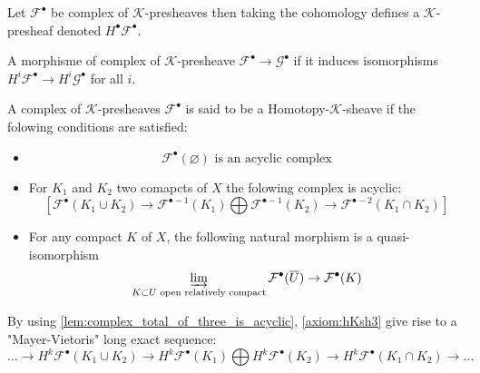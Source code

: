 \begin{definition}\label{def:cohomology_of_k-prsh}
    Let $\mathcal{F}^{\bullet}$ be complex of $\mathcal{K}$-presheaves then taking the cohomology defines a $\mathcal{K}$-presheaf denoted $H^{\bullet}\mathcal{F}^{\bullet}$.
\end{definition}

\begin{definition}\label{def:quasi_iso_of_complex_of_k-prsh}
    A morphisme of complex of $\mathcal{K}$-presheave $\mathcal{F}^{\bullet}\to\mathcal{G}^{\bullet}$ if it induces isomorphisms $H^i\mathcal{F}^{\bullet}\to H^i\mathcal{G}^{\bullet}$ for all $i$.
\end{definition}

\begin{definition}\label{def:homotopy_k_sheaf}
    A complex of $\mathcal{K}$-presheaves $\mathcal{F}^{\bullet}$ is said to be a Homotopy-$\mathcal{K}$-sheave if the folowing conditions are satisfied:\begin{itemize}
        \item\begin{equation}\label{axiom:hKsh1}
            \mathcal{F}^{\bullet}(\varnothing) \text{ is an acyclic complex}
        \end{equation}
        \item For $K_1$ and $K_2$ two comapcts of $X$ the folowing complex is acyclic:\begin{equation}\label{axiom:hKsh2}
             [\mathcal{F}^{\bullet}(K_1\cup K_2)\to \mathcal{F}^{\bullet-1}(K_1)\bigoplus\mathcal{F}^{\bullet-1}(K_2)\to \mathcal{F}^{\bullet-2}(K_1\cap K_2) ]
        \end{equation}
        \item For any compact $K$ of $X$, the following natural morphism is a quasi-isomorphism \begin{equation}\label{axiom:hKsh3}
            \varinjlim\limits_{K\subset U\text{ open relatively compact}}\mathcal{F}^{\bullet}(\overline{U})\to \mathcal{F}^{\bullet}(K)
        \end{equation}
    \end{itemize}
\end{definition}

\begin{lemma}\label{lem:Mayer_Vietoris}
    By using \ref{lem:complex_total_of_three_is_acyclic}, \eqref{axiom:hKsh3} give rise to a "Mayer-Vietoris" long exact sequence: \[\ldots \to H^k \mathcal{F}^{\bullet}(K_1\cup K_2)\to H^k \mathcal{F}^{\bullet}(K_1)\bigoplus H^k\mathcal{F}^{\bullet}(K_2)\to H^k \mathcal{F}^{\bullet}(K_1\cap K_2)\to \ldots\]
\end{lemma}

